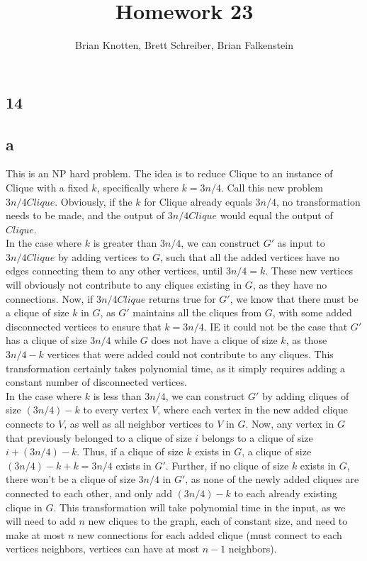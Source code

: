 \documentclass[letterpaper,notitlepage,twoside]{article}
\begin{document}
\title{Homework 23}
\author{Brian Knotten, Brett Schreiber, Brian Falkenstein}
\maketitle
\subsection*{14}
\subsection*{a}
This is an NP hard problem. The idea is to reduce Clique to an instance of Clique with a fixed $k$, specifically where $k=3n/4$. Call this new problem $3n/4Clique$. Obviously, if the $k$ for Clique already equals $3n/4$, no transformation needs to be made, and the output of $3n/4Clique$ would equal the output of $Clique$. \\
In the case where $k$ is greater than $3n/4$, we can construct $G'$ as input to  $3n/4Clique$ by adding vertices to $G$, such that all the added vertices have no edges connecting them to any other vertices, until $3n/4 = k$. These new vertices will obviously not contribute to any cliques existing in $G$, as they have no connections. 
Now, if $3n/4Clique$ returns true for $G'$, we know that there must be a clique of size $k$ in $G$, as $G'$ maintains all the cliques from $G$, with some added disconnected vertices to ensure that $k=3n/4$. IE it could not be the case that $G'$ has a clique of size $3n/4$ while $G$ does not have a clique of size $k$, as those $3n/4 -k$ vertices that were added could not contribute to any cliques. This transformation certainly takes polynomial time, as it simply requires adding a constant number of disconnected vertices.\\
In the case where $k$ is less than $3n/4$, we can construct $G'$ by adding cliques of size $(3n/4) - k$ to every vertex $V$, where each vertex in the new added clique connects to $V$, as well as all neighbor vertices to $V$ in $G$. Now, any vertex in $G$ that previously belonged to a clique of size $i$ belongs to a clique of size $i + (3n/4) - k$. Thus, if a clique of size $k$ exists in $G$, a clique of size $(3n/4) - k + k = 3n/4$ exists in $G'$. Further, if no clique of size $k$ exists in $G$, there won't be a clique of size $3n/4$ in $G'$, as none of the newly added cliques are connected to each other, and only add $(3n/4) - k$ to each already existing clique in $G$. This transformation will take polynomial time in the input, as we will need to add $n$ new cliques to the graph, each of constant size, and need to make at most $n$ new connections for each added clique (must connect to each vertices neighbors, vertices can have at most $n-1$ neighbors). \\
\end{document}
